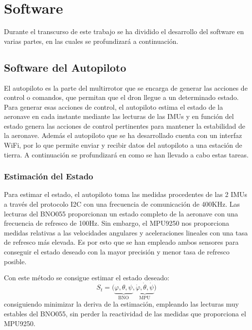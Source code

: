 \chapter{Software}

Durante el transcurso de este trabajo se ha dividido el desarrollo del software en varias partes, en las cuales se profundizará a continuación.

\section{Software del Autopiloto}
	
	El autopiloto es la parte del multirrotor que se encarga de generar las acciones de control o comandos, que permitan que el dron llegue a un determinado estado.
	Para generar esas acciones de control, el autopiloto estima el estado de la aeronave en cada instante mediante las lecturas de las IMUs y en función del estado genera las acciones de control pertinentes para mantener la estabilidad de la aeronave. Además el autopiloto que se ha desarrollado cuenta con un interfaz WiFi, por lo que permite enviar y recibir datos del autopiloto a una estación de tierra. A continuación se profundizará en como se han llevado a cabo estas tareas.

\subsection{Estimación del Estado}
	Para estimar el estado, el autopiloto toma las medidas procedentes de las 2 IMUs a través del protocolo I2C con una frecuencia de comunicación de 400KHz.
	Las lecturas del BNO055 proporcionan un estado completo de la aeronave con una frecuencia de refresco de 100Hz. Sin embargo, el MPU9250 nos proporciona medidas relativas a las velocidades angulares y aceleraciones lineales con una tasa de refresco más elevada. Es por esto que se han empleado ambos sensores para conseguir el estado deseado con la mayor precisión y menor tasa de refresco posible.
	
	Con este método se consigue estimar el estado deseado:
	 \begin{equation}
	 	S_t=\big(\underbrace{\varphi,\theta,\psi}_\text{BNO} ,\underbrace{\dot\varphi,\dot\theta,\dot\psi}_\text{MPU} \big)
	 \end{equation}
	consiguiendo minimizar la deriva de la estimación, empleando las lecturas muy estables del BNO055, sin perder la reactividad de las medidas que proporciona el MPU9250.
	
